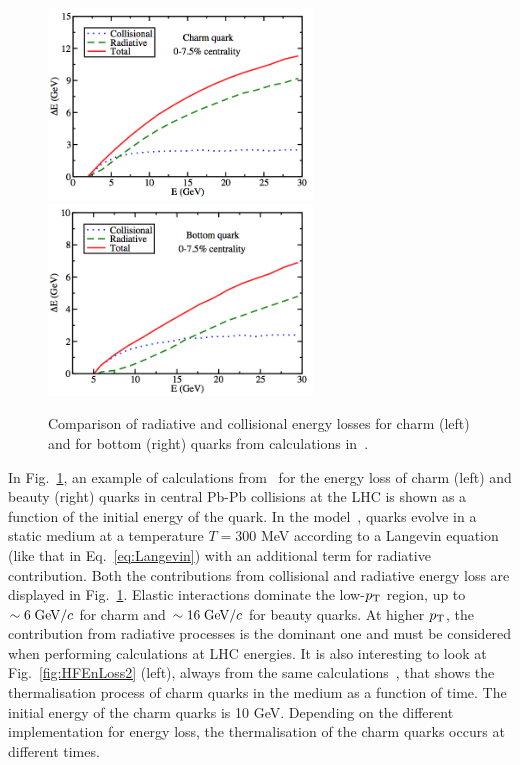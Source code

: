 \begin{figure}[!ht]
  \centering
  \includegraphics[width=7cm]{FigCap2/HFEnLoss1.png}
  \includegraphics[width=7cm]{FigCap2/HFEnLoss2.png}
  \caption{Comparison of radiative and collisional energy losses for charm (left) and for bottom (right) quarks from calculations in~\cite{Cao:2013ita}.}
  \label{fig:HFEnLoss}
\end{figure}
In Fig.~\ref{fig:HFEnLoss}, an example of calculations from~\cite{Cao:2013ita}
for the energy loss of charm (left) and beauty (right) quarks 
in central Pb-Pb collisions at the LHC is shown as a function of the initial energy of the quark.
In the model~\cite{Cao:2013ita}, quarks evolve in a static medium at a temperature
$T = 300$ MeV according to a Langevin equation (like that in Eq.~\ref{eq:Langevin}) with 
an additional term for radiative contribution. 
Both the contributions from collisional and radiative energy loss 
are displayed in Fig.~\ref{fig:HFEnLoss}. Elastic interactions
dominate the low-$p_{\rm T}$ region, up to $\sim 6\; \mathrm{GeV}/c$ for charm and $\sim 16 \;\mathrm{GeV}/c$ for beauty quarks.
At higher $p_{\rm T}$, the contribution from radiative processes is the dominant one and must be considered when 
performing calculations at LHC energies.
It is also interesting to look at Fig.~\ref{fig:HFEnLoss2} (left), always from the
same calculations~\cite{Cao:2013ita}, that shows the 
thermalisation process of charm quarks in the medium as a function of time.
The initial energy of the charm quarks is 10 GeV. Depending on the different implementation for energy
loss, the thermalisation of the charm quarks occurs at different times.\\
